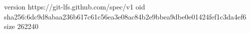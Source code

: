 version https://git-lfs.github.com/spec/v1
oid sha256:6dc9d8abaa236b617c61c56ea3e08ac84b2e9bbea9dbe0e01424fef1c3da4ef6
size 262240

